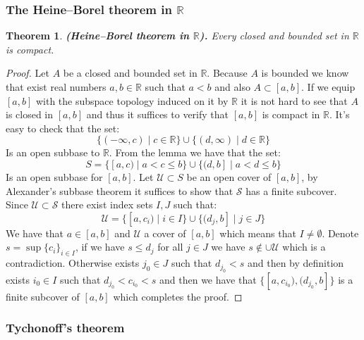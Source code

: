 \documentclass[11pt,a4paper]{article}
\theoremstyle{definition}
\theoremstyle{plain}
\newtheorem{theorem}{Theorem}[section]
\newcommand{\R}{\mathbb{R}}
\renewcommand{\tt}[1]{\textnormal{\textbf{(#1).}}} %
\begin{document}
  \subsubsection{The Heine--Borel theorem in \texorpdfstring{$\R$}{R}}

  \begin{theorem}
    \tt{Heine--Borel theorem in $\R$}
    Every closed and bounded set in $\R$ is compact.
  \end{theorem}
  \begin{proof}
    Let $A$ be a closed and bounded set in $\R$. Because $A$ is bounded
    we know that exist real numbers $a,b \in \R$ such that $a < b$ and
    also $A \subset [a,b]$. If we equip $[a,b]$ with the subspace
    topology induced on it by $\R$ it is not hard to see that $A$ is
    closed in $[a,b]$ and thus it suffices to verify that $[a,b]$
    is compact in $\R$. It's easy to check that the set:
    \[
      \{(-\infty, c) \mid c \in \R\} \cup 
      \{(d, \infty) \mid d \in \R\}
    \]
    Is an open subbase to $\R$. From the lemma we have that the set:
    \[
      S = \{[a, c) \mid a < c \le b\} \cup 
      \{(d, b] \mid a < d \le b\}
    \]
    Is an open subbase for $[a,b]$. Let $\mathcal{U} \subset S$ be an
    open cover of $[a,b]$, by Alexander's subbase theorem it suffices
    to show that $\mathcal{S}$ has a finite subcover. Since 
    $\mathcal{U} \subset \mathcal{S}$ there exist index sets $I,J$ such 
    that:
    \[
      \mathcal{U} = 
      \{[a,c_i) \mid i \in I\} \cup \{(d_j,b] \mid j \in J\}
    \]
    We have that $a \in [a,b]$ and $\mathcal{U}$ a cover of $[a,b]$
    which means that $I \neq \emptyset$. 
    Denote $s = \sup\{c_i\}_{i\in I}$,  if we have $s \le d_j$ for
    all $j \in J$ we have $s \notin \cup\mathcal{U}$ which is a 
    contradiction. Otherwise exists $j_0 \in J$ such that 
    $d_{j_0} < s$ and then by definition exists $i_0 \in I$ such that
    $d_{j_0} < c_{i_0} < s$ and then we have that 
    $\{[a,c_{i_0}), (d_{j_0},b]\}$ is a finite subcover of $[a,b]$ which
    completes the proof.
  \end{proof}

  \subsubsection{Tychonoff's theorem}
\end{document}
